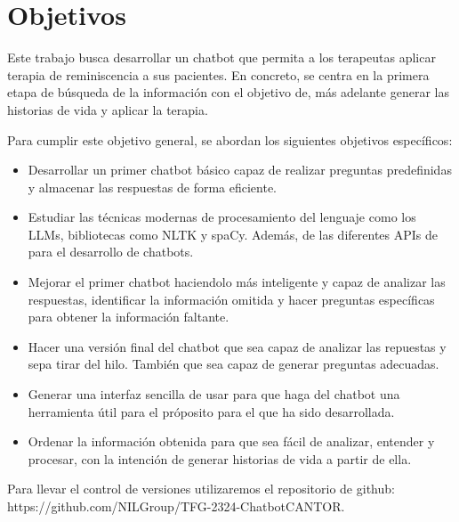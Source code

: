 \section{Objetivos}
Este trabajo  busca desarrollar un chatbot que permita a los terapeutas aplicar terapia de reminiscencia a sus pacientes. En concreto, se centra en la primera etapa de búsqueda de la información con el objetivo de, más adelante generar las historias de vida y aplicar la terapia. 

Para cumplir este objetivo general, se abordan los siguientes objetivos específicos:

 \begin{itemize}
 	
\item Desarrollar un primer chatbot básico capaz de realizar preguntas predefinidas y almacenar las respuestas de forma eficiente.
 
 \item Estudiar las técnicas modernas de procesamiento del lenguaje como los LLMs, bibliotecas como NLTK y spaCy. Además, de las diferentes APIs de para el desarrollo de chatbots. 
 
\item Mejorar el primer chatbot haciendolo más inteligente y capaz de analizar las respuestas, identificar la información omitida y hacer preguntas específicas para obtener la información faltante.
 
\item Hacer una versión final del chatbot que sea capaz de analizar las repuestas y sepa tirar del hilo. También que sea capaz de generar preguntas adecuadas. 

\item Generar una interfaz sencilla de usar para que haga del chatbot una herramienta útil para el próposito para el que ha sido desarrollada.

\item Ordenar la información obtenida para que sea fácil de analizar, entender y procesar, con la intención de generar historias de vida a partir de ella. 

\end{itemize}

Para llevar el control de versiones utilizaremos el repositorio de github:\\
 https://github.com/NILGroup/TFG-2324-ChatbotCANTOR. 

